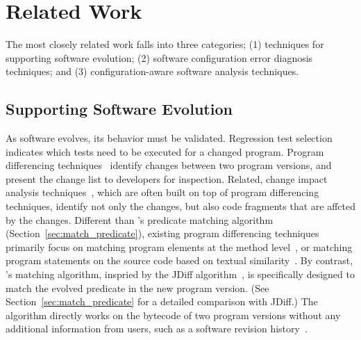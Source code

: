 \section{Related Work}
\label{sec:related}

The most closely related work falls into
three categories; (1) techniques for
supporting software evolution; (2) software
configuration error diagnosis techniques;
and (3) configuration-aware software analysis techniques.

\subsection{Supporting Software Evolution}

As software evolves, its behavior must be validated.
Regression test selection~\cite{regression}
indicates which tests need to be executed for a changed
program.  Program differencing techniques~\cite{Giroux:2006:DIF, Xing:2005:UAO, Thummalapenta:2010:ESM, Kim:2013, Jin:2012:BRF,Nguyen:2010:RBF,Dig:2006:ADR, Kamiya:2002:CMT, Dagenais:2008}
identify changes between two program versions,
and present the change list to developers for inspection.
Related, change impact analysis techniques~\cite{STVR:STVR1475}, which
are often built on top of program differencing
techniques, identify not only the changes, but also
code fragments that are affcted by the changes. 
Different than \ourtool's predicate matching
algorithm (Section~\ref{sec:match_predicate}),
existing program differencing techniques primarily focus on matching
program elements at the method level~\cite{frameworkevolution,
Xing:2005:UAO, Kim:2013, Nguyen:2010:RBF,Dig:2006:ADR,
Kamiya:2002:CMT, Dagenais:2008},
or matching program statements on the source code based on
textual similarity~\cite{Horwitz:1990:IST}.
By contrast, \ourtool's matching algorithm, inspried by
the JDiff algorithm~\cite{Apiwattanapong:2004}, is specifically designed 
to match the evolved predicate in the new program version.
(See Section~\ref{sec:match_predicate} for a detailed
comparison with JDiff.)
The algorithm directly works on the bytecode of two program
versions without any additional information from users,
such as a software revision history~\cite{frameworkevolution}.


